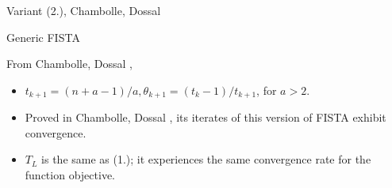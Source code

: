 \documentclass[11pt]{beamer}
\theoremstyle{definition}
\begin{document}
    \begin{frame}{Variant (2.), Chambolle, Dossal}
        \begin{algorithm}[H]
            \begin{tiny}
                \begin{algorithmic}[1]
                    \ENDFOR
                \end{algorithmic}
                \caption{Generic FISTA}    
            \end{tiny}
        \end{algorithm}
        From Chambolle, Dossal \cite{chambolle_convergence_2015}, 
        \begin{itemize}
            \item $t_{k + 1} = (n + a - 1)/a, \theta_{k + 1} = (t_{k} - 1)/t_{k + 1}$, for $a > 2$. 
            \item Proved in Chambolle, Dossal \cite[thm 4.1]{chambolle_convergence_2015}, its iterates of this version of FISTA exhibit convergence. 
            \item $T_L$ is the same as (1.); it experiences the same convergence rate for the function objective. 
        \end{itemize}
    \end{frame}
\end{document}
